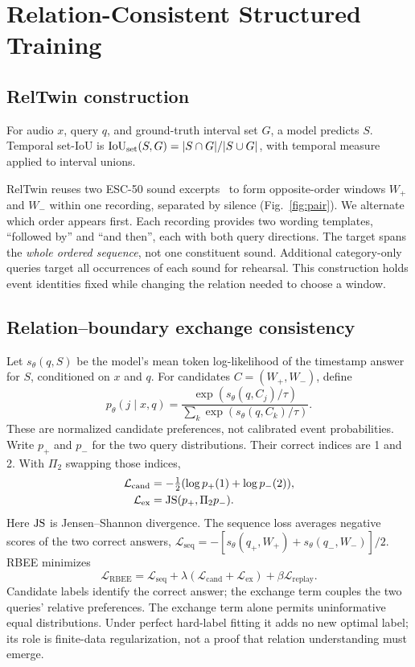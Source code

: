 \section{Relation-Consistent Structured Training}
\subsection{RelTwin construction}
For audio $x$, query $q$, and ground-truth interval set $G$, a model predicts $S$. Temporal set-IoU is $\operatorname{IoU}_{\mathrm{set}}(S,G)=|S\cap G|/|S\cup G|$, with temporal measure applied to interval unions.

RelTwin reuses two ESC-50 sound excerpts~\cite{piczak2015esc} to form opposite-order windows $W_+$ and $W_-$ within one recording, separated by silence (Fig.~\ref{fig:pair}). We alternate which order appears first. Each recording provides two wording templates, ``followed by'' and ``and then'', each with both query directions. The target spans the \emph{whole ordered sequence}, not one constituent sound. Additional category-only queries target all occurrences of each sound for rehearsal. This construction holds event identities fixed while changing the relation needed to choose a window.

\subsection{Relation--boundary exchange consistency}
Let $s_\theta(q,S)$ be the model's mean token log-likelihood of the timestamp answer for $S$, conditioned on $x$ and $q$. For candidates $C=(W_+,W_-)$, define
\begin{equation}
p_\theta(j\mid x,q)=
\frac{\exp(s_\theta(q,C_j)/\tau)}{\sum_k\exp(s_\theta(q,C_k)/\tau)}.
\label{eq:preference}
\end{equation}
These are normalized candidate preferences, not calibrated event probabilities. Write $p_+$ and $p_-$ for the two query distributions. Their correct indices are 1 and 2. With $\Pi_2$ swapping those indices,
\begin{align}
\mathcal L_{\mathrm{cand}}&=-\tfrac12(\log p_+(1)+\log p_-(2)),\\
\mathcal L_{\mathrm{ex}}&=\operatorname{JS}(p_+,\Pi_2p_-).
\label{eq:exchange}
\end{align}
Here $\operatorname{JS}$ is Jensen--Shannon divergence. The sequence loss averages negative scores of the two correct answers, $\mathcal L_{\mathrm{seq}}=-[s_\theta(q_+,W_+)+s_\theta(q_-,W_-)]/2$. RBEE minimizes
\begin{equation}
\mathcal L_{\mathrm{RBEE}}=\mathcal L_{\mathrm{seq}}+
\lambda(\mathcal L_{\mathrm{cand}}+\mathcal L_{\mathrm{ex}})
+\beta\mathcal L_{\mathrm{replay}}.
\label{eq:rbee}
\end{equation}
Candidate labels identify the correct answer; the exchange term couples the two queries' relative preferences. The exchange term alone permits uninformative equal distributions. Under perfect hard-label fitting it adds no new optimal label; its role is finite-data regularization, not a proof that relation understanding must emerge.


